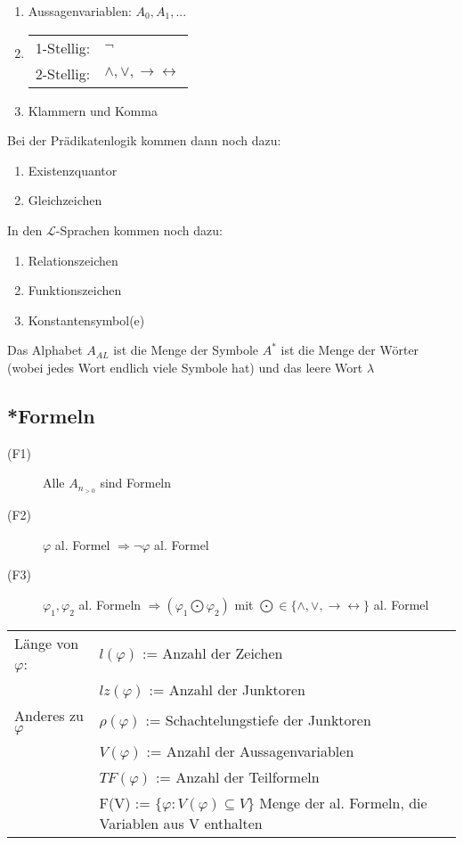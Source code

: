 \documentclass[12pt,a4paper]{article} %
\begin{document}
	\begin{enumerate}
		\item Aussagenvariablen: $A_0, A_1, ...$
		\item \begin{tabular}{l l}
			1-Stellig: & $\neg$ \\
			2-Stellig: & $\land, \lor, \rightarrow \leftrightarrow$
		\end{tabular}
		\item Klammern und Komma
	\end{enumerate}
	Bei der Prädikatenlogik kommen dann noch dazu:
	\begin{enumerate}
		\addtocounter{enumi}{3}
		\item Existenzquantor
		\item Gleichzeichen
	\end{enumerate}
	In den $\mathcal{L}$-Sprachen kommen noch dazu:
	\begin{enumerate}
		\addtocounter{enumi}{5}
		\item Relationszeichen
		\item Funktionszeichen
		\item Konstantensymbol(e)
	\end{enumerate}
	Das Alphabet $A_{AL}$ ist die Menge der Symbole \newline
	$A^*$ ist die Menge der Wörter (wobei jedes Wort endlich viele Symbole hat) und das leere Wort $\lambda$
	
	\subsection{*Formeln}
	\label{Formel}
	\begin{description}
		\item[(F1)] Alle $A_{n_{> 0}}$ sind Formeln
		\item[(F2)] $\varphi$ al. Formel $\Rightarrow \neg \varphi$ al. Formel
		\item[(F3)] $\varphi_1, \varphi_2$ al. Formeln $\Rightarrow (\varphi_1 \bigodot \varphi_2)$ mit $\bigodot \in \{\land, \lor, \rightarrow\leftrightarrow\}$ al. Formel
	\end{description}	
	
	\begin{tabular}{l p{10cm}}
		Länge von $\varphi$: & $l(\varphi)$ := Anzahl der Zeichen \\
		& $lz(\varphi)$ := Anzahl der Junktoren \\
		Anderes zu $\varphi$ & $\rho(\varphi)$ := Schachtelungstiefe der Junktoren \\
		& $V(\varphi)$ := Anzahl der Aussagenvariablen \\
		& $TF(\varphi)$ := Anzahl der Teilformeln \\
		& F(V) := $\{\varphi: V(\varphi) \subseteq V\}$ Menge der al. Formeln, die Variablen aus V enthalten
	\end{tabular}
	
\end{document}
